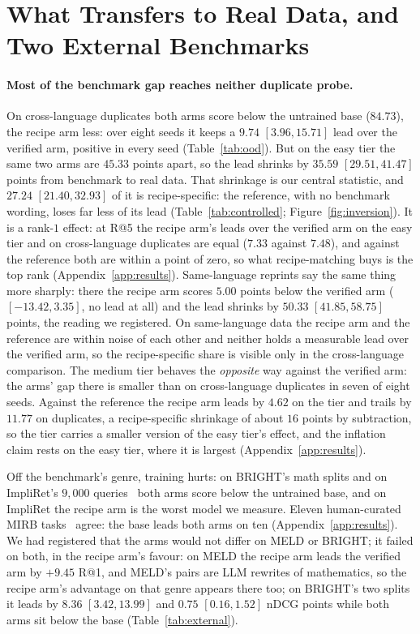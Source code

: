 \section{What Transfers to Real Data, and Two External Benchmarks}
\label{sec:ood}

\paragraph{Most of the benchmark gap reaches neither duplicate probe.}
On cross-language duplicates both arms score below the untrained base ($84.73$), the recipe arm less: over eight seeds it keeps a $9.74$ $[3.96, 15.71]$ lead over the verified arm, positive in every seed (Table~\ref{tab:ood}). But on the easy tier the same two arms are $45.33$ points apart, so the lead shrinks by $35.59$ $[29.51, 41.47]$ points from benchmark to real data. That shrinkage is our central statistic, and $27.24$ $[21.40, 32.93]$ of it is recipe-specific: the reference, with no benchmark wording, loses far less of its lead (Table~\ref{tab:controlled}; Figure~\ref{fig:inversion}). It is a rank-$1$ effect: at R@5 the recipe arm's leads over the verified arm on the easy tier and on cross-language duplicates are equal ($7.33$ against $7.48$), and against the reference both are within a point of zero, so what recipe-matching buys is the top rank (Appendix~\ref{app:results}). Same-language reprints say the same thing more sharply: there the recipe arm scores $5.00$ points below the verified arm ($[-13.42, 3.35]$, no lead at all) and the lead shrinks by $50.33$ $[41.85, 58.75]$ points, the reading we registered. On same-language data the recipe arm and the reference are within noise of each other and neither holds a measurable lead over the verified arm, so the recipe-specific share is visible only in the cross-language comparison. The medium tier behaves the \emph{opposite} way against the verified arm: the arms' gap there is smaller than on cross-language duplicates in seven of eight seeds. Against the reference the recipe arm leads by $4.62$ on the tier and trails by $11.77$ on duplicates, a recipe-specific shrinkage of about $16$ points by subtraction, so the tier carries a smaller version of the easy tier's effect, and the inflation claim rests on the easy tier, where it is largest (Appendix~\ref{app:results}).

Off the benchmark's genre, training hurts: on BRIGHT's math splits and on ImpliRet's $9{,}000$ queries~\citep{taghavi2025impliret} both arms score below the untrained base, and on ImpliRet the recipe arm is the worst model we measure. Eleven human-curated MIRB tasks~\citep{ju2025mirb} agree: the base leads both arms on ten (Appendix~\ref{app:results}). We had registered that the arms would not differ on MELD or BRIGHT; it failed on both, in the recipe arm's favour: on MELD the recipe arm leads the verified arm by $+9.45$ R@1, and MELD's pairs are LLM rewrites of mathematics, so the recipe arm's advantage on that genre appears there too; on BRIGHT's two splits it leads by $8.36$ $[3.42, 13.99]$ and $0.75$ $[0.16, 1.52]$ nDCG points while both arms sit below the base (Table~\ref{tab:external}).

